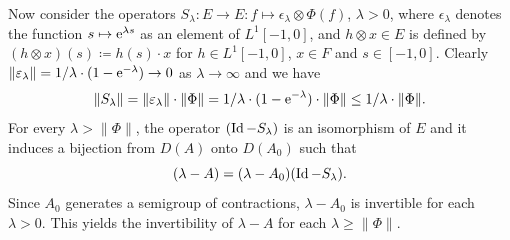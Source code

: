 Now consider the operators $S_{\lambda} \colon E \to E \colon f \mapsto \epsilon_{\lambda} \otimes \Phi(f)$, $\lambda > 0$, where $\epsilon_{\lambda}$ denotes the function $s \mapsto \mathrm{e}^{\lambda s}$ as an element of\/ $L^{1}[-1,0]$, 
and $h \otimes x \in E$ is defined by 
$(h \otimes x)(s) \coloneq h(s) \cdot x$ for $h \in L^{1}[-1,0]$, $x \in F$ and $s \in [-1,0]$.
Clearly 
$\|\epsilon_{\lambda}\| = 1/\lambda \cdot (1 - \eu^{-\lambda}) \to 0$ as $\lambda \to \infty$ and we have
\[
\|S_{\lambda}\| = \|\epsilon_{\lambda}\| \cdot \|\Phi\| = 1/\lambda \cdot (1 - \eu^{-\lambda}) \cdot \|\Phi\| \leq 1/\lambda \cdot \|\Phi\| .
\]
For every $\lambda > \|\Phi\|$, the operator $(\operatorname{Id} - S_{\lambda})$ is an isomorphism of\/ $E$ and it induces a bijection from $D(A)$ onto $D(A_{0})$ such that
\begin{equation}\label{eq:c4-3.2}
(\lambda - A) = (\lambda - A_{0})(\operatorname{Id} - S_{\lambda}).
\end{equation}
Since $A_{0}$ generates a semigroup of contractions, $\lambda - A_{0}$ is invertible for each $\lambda > 0$.
This yields the invertibility of\/ $\lambda - A$ for each $\lambda \geq \|\Phi\|$.

